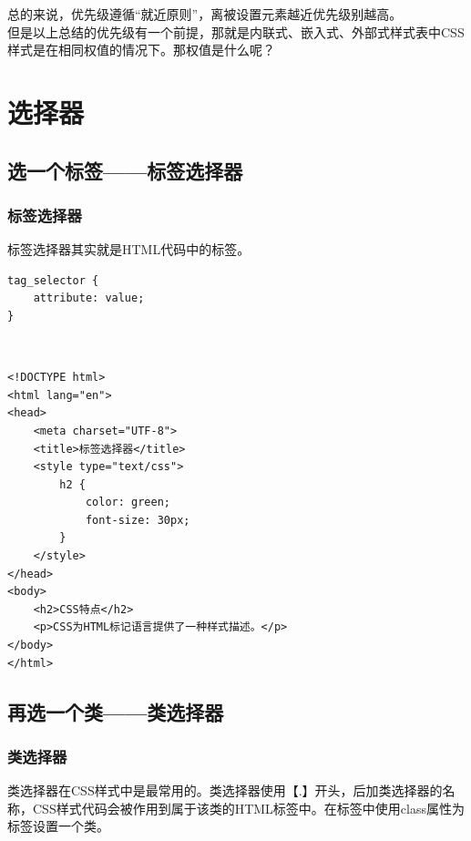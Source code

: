 总的来说，优先级遵循“就近原则”，离被设置元素越近优先级别越高。\\

但是以上总结的优先级有一个前提，那就是内联式、嵌入式、外部式样式表中CSS样式是在相同权值的情况下。那权值是什么呢？

\newpage

\chapter{选择器}

\section{选一个标签——标签选择器}

\subsection{标签选择器}

标签选择器其实就是HTML代码中的标签。\\

\begin{lstlisting}[style=htmlcssjs]
tag_selector {
    attribute: value;
}
\end{lstlisting}

\vspace{0.5cm}

\\

\begin{lstlisting}[style=htmlcssjs]
<!DOCTYPE html>
<html lang="en">
<head>
    <meta charset="UTF-8">
    <title>标签选择器</title>
    <style type="text/css">
        h2 {
            color: green;
            font-size: 30px;
        }
    </style>
</head>
<body>
    <h2>CSS特点</h2>
    <p>CSS为HTML标记语言提供了一种样式描述。</p>
</body>
</html>
\end{lstlisting}

\newpage

\section{再选一个类——类选择器}

\subsection{类选择器}

类选择器在CSS样式中是最常用的。类选择器使用【.】开头，后加类选择器的名称，CSS样式代码会被作用到属于该类的HTML标签中。在标签中使用class属性为标签设置一个类。\\

